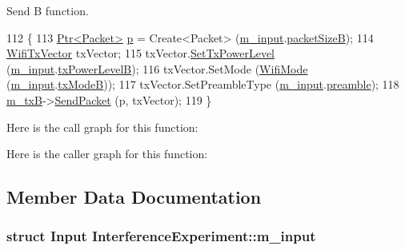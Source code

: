 Send B function. 


\begin{DoxyCode}
112 \{
113   \hyperlink{classns3_1_1Ptr}{Ptr<Packet>} \hyperlink{lte__link__budget_8m_ac9de518908a968428863f829398a4e62}{p} = Create<Packet> (\hyperlink{classInterferenceExperiment_a36c38e073c0d336135f6ff16b0cdaeac}{m\_input}.\hyperlink{structInterferenceExperiment_1_1Input_af43818556e8f08c6e85b4aff90c00c41}{packetSizeB});
114   \hyperlink{classns3_1_1WifiTxVector}{WifiTxVector} txVector;
115   txVector.\hyperlink{classns3_1_1WifiTxVector_a25743cd89a5cb95ec22a9e584fa044f3}{SetTxPowerLevel} (\hyperlink{classInterferenceExperiment_a36c38e073c0d336135f6ff16b0cdaeac}{m\_input}.\hyperlink{structInterferenceExperiment_1_1Input_a4acd70506b27a4c59504e68639101fd1}{txPowerLevelB});
116   txVector.SetMode (\hyperlink{classns3_1_1WifiMode}{WifiMode} (\hyperlink{classInterferenceExperiment_a36c38e073c0d336135f6ff16b0cdaeac}{m\_input}.\hyperlink{structInterferenceExperiment_1_1Input_a79f27f84600607d35444fb9840b5b3ef}{txModeB}));
117   txVector.SetPreambleType (\hyperlink{classInterferenceExperiment_a36c38e073c0d336135f6ff16b0cdaeac}{m\_input}.\hyperlink{structInterferenceExperiment_1_1Input_aa65f6eed675014431f9750aa15197edc}{preamble});
118   \hyperlink{classInterferenceExperiment_ac2071a3bf35e68a316a7d251327d5708}{m\_txB}->\hyperlink{classns3_1_1WifiPhy_a4caf22eb334a9caca21ec37d90a74ce2}{SendPacket} (p, txVector);
119 \}
\end{DoxyCode}


Here is the call graph for this function\+:




Here is the caller graph for this function\+:




\subsection{Member Data Documentation}
\subsubsection[{\texorpdfstring{m\+\_\+input}{m_input}}]{\setlength{\rightskip}{0pt plus 5cm}struct {\bf Input} Interference\+Experiment\+::m\+\_\+input\hspace{0.3cm}{\ttfamily [private]}}\hypertarget{classInterferenceExperiment_a36c38e073c0d336135f6ff16b0cdaeac}{}\label{classInterferenceExperiment_a36c38e073c0d336135f6ff16b0cdaeac}


